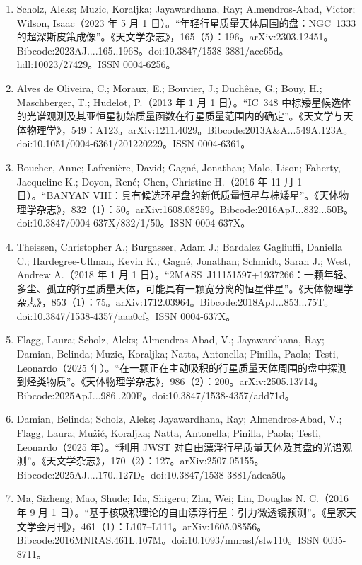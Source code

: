 \begin{enumerate}
\item Scholz, Aleks; Muzic, Koraljka; Jayawardhana, Ray; Almendros-Abad, Victor; Wilson, Isaac（2023 年 5 月 1 日）。“年轻行星质量天体周围的盘：NGC~1333 的超深斯皮策成像”。《天文学杂志》，165（5）：196。arXiv:2303.12451。Bibcode:2023AJ....165..196S。doi:10.3847/1538-3881/acc65d。hdl:10023/27429。ISSN 0004-6256。  
\item Alves de Oliveira, C.; Moraux, E.; Bouvier, J.; Duchêne, G.; Bouy, H.; Maschberger, T.; Hudelot, P.（2013 年 1 月 1 日）。“IC~348 中棕矮星候选体的光谱观测及其亚恒星初始质量函数在行星质量范围内的确定”。《天文学与天体物理学》，549：A123。arXiv:1211.4029。Bibcode:2013A\&A...549A.123A。doi:10.1051/0004-6361/201220229。ISSN 0004-6361。  
\item Boucher, Anne; Lafrenière, David; Gagné, Jonathan; Malo, Lison; Faherty, Jacqueline K.; Doyon, René; Chen, Christine H.（2016 年 11 月 1 日）。“BANYAN VIII：具有候选环星盘的新低质量恒星与棕矮星”。《天体物理学杂志》，832（1）：50。arXiv:1608.08259。Bibcode:2016ApJ...832...50B。doi:10.3847/0004-637X/832/1/50。ISSN 0004-637X。  
\item Theissen, Christopher A.; Burgasser, Adam J.; Bardalez Gagliuffi, Daniella C.; Hardegree-Ullman, Kevin K.; Gagné, Jonathan; Schmidt, Sarah J.; West, Andrew A.（2018 年 1 月 1 日）。“2MASS~J11151597+1937266：一颗年轻、多尘、孤立的行星质量天体，可能具有一颗宽分离的恒星伴星”。《天体物理学杂志》，853（1）：75。arXiv:1712.03964。Bibcode:2018ApJ...853...75T。doi:10.3847/1538-4357/aaa0cf。ISSN 0004-637X。
\item Flagg, Laura; Scholz, Aleks; Almendros-Abad, V.; Jayawardhana, Ray; Damian, Belinda; Muzic, Koraljka; Natta, Antonella; Pinilla, Paola; Testi, Leonardo（2025 年）。“在一颗正在主动吸积的行星质量天体周围的盘中探测到烃类物质”。《天体物理学杂志》，986（2）：200。arXiv:2505.13714。Bibcode:2025ApJ...986..200F。doi:10.3847/1538-4357/add71d。  
\item Damian, Belinda; Scholz, Aleks; Jayawardhana, Ray; Almendros-Abad, V.; Flagg, Laura; Mužić, Koraljka; Natta, Antonella; Pinilla, Paola; Testi, Leonardo（2025 年）。“利用 JWST 对自由漂浮行星质量天体及其盘的光谱观测”。《天文学杂志》，170（2）：127。arXiv:2507.05155。Bibcode:2025AJ....170..127D。doi:10.3847/1538-3881/adea50。  
\item Ma, Sizheng; Mao, Shude; Ida, Shigeru; Zhu, Wei; Lin, Douglas N. C.（2016 年 9 月 1 日）。“基于核吸积理论的自由漂浮行星：引力微透镜预测”。《皇家天文学会月刊》，461（1）：L107--L111。arXiv:1605.08556。Bibcode:2016MNRAS.461L.107M。doi:10.1093/mnrasl/slw110。ISSN 0035-8711。  

\end{enumerate}
